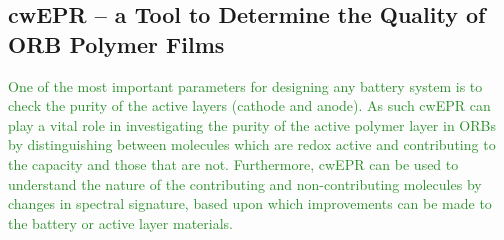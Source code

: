 \documentclass{WileyMSP-template}
\newcommand{\np}[1]{\textcolor{ForestGreen}{#1}}
\newcommand{\ik}[1]{\textcolor{RawSienna}{#1}}
\begin{document}
%

\bigbreak

\subsection*{cwEPR -- a Tool to Determine the Quality of ORB Polymer Films}

\np{
	One of the most important parameters for designing any battery system is to check the purity of the active layers (cathode and anode). As such cwEPR can play a vital role in investigating the purity of the active polymer layer in ORBs by distinguishing between molecules which are redox active and contributing to the capacity and those that are not. Furthermore, cwEPR can be used to understand the nature of the contributing and non-contributing molecules by changes in spectral signature, based upon which improvements can be made to the battery or active layer materials.
}
\end{document}
